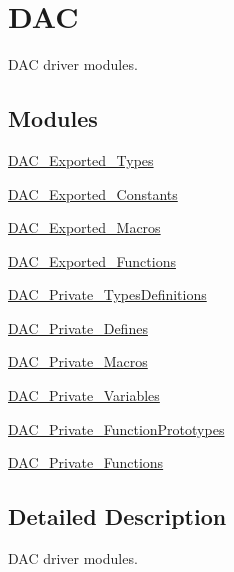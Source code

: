\hypertarget{group___d_a_c}{}\section{D\+AC}
\label{group___d_a_c}


D\+AC driver modules.  


\subsection*{Modules}
\begin{DoxyCompactItemize}
\item 
\mbox{\hyperlink{group___d_a_c___exported___types}{D\+A\+C\+\_\+\+Exported\+\_\+\+Types}}
\item 
\mbox{\hyperlink{group___d_a_c___exported___constants}{D\+A\+C\+\_\+\+Exported\+\_\+\+Constants}}
\item 
\mbox{\hyperlink{group___d_a_c___exported___macros}{D\+A\+C\+\_\+\+Exported\+\_\+\+Macros}}
\item 
\mbox{\hyperlink{group___d_a_c___exported___functions}{D\+A\+C\+\_\+\+Exported\+\_\+\+Functions}}
\item 
\mbox{\hyperlink{group___d_a_c___private___types_definitions}{D\+A\+C\+\_\+\+Private\+\_\+\+Types\+Definitions}}
\item 
\mbox{\hyperlink{group___d_a_c___private___defines}{D\+A\+C\+\_\+\+Private\+\_\+\+Defines}}
\item 
\mbox{\hyperlink{group___d_a_c___private___macros}{D\+A\+C\+\_\+\+Private\+\_\+\+Macros}}
\item 
\mbox{\hyperlink{group___d_a_c___private___variables}{D\+A\+C\+\_\+\+Private\+\_\+\+Variables}}
\item 
\mbox{\hyperlink{group___d_a_c___private___function_prototypes}{D\+A\+C\+\_\+\+Private\+\_\+\+Function\+Prototypes}}
\item 
\mbox{\hyperlink{group___d_a_c___private___functions}{D\+A\+C\+\_\+\+Private\+\_\+\+Functions}}
\end{DoxyCompactItemize}


\subsection{Detailed Description}
D\+AC driver modules. 

